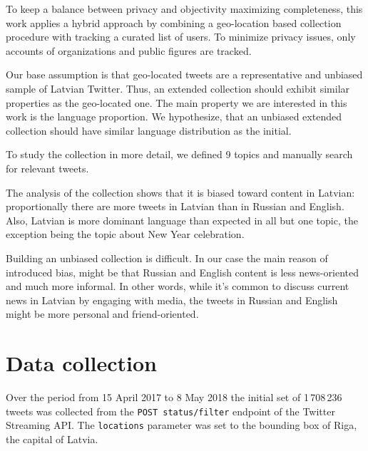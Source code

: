 \documentclass{IOS-Book-Article}
\newcommand{\hl}[1]{#1}
\begin{document}
To keep a balance between privacy and objectivity maximizing completeness, this work applies a hybrid approach by combining a geo-location based collection procedure with tracking a curated list of users. To minimize privacy issues, only accounts of organizations and public figures are tracked.


Our base assumption is that geo-located tweets are a representative and unbiased sample of Latvian Twitter. Thus, an extended collection should exhibit similar properties as the geo-located one. The main property we are interested in this work is the language proportion. We hypothesize, that an unbiased extended collection should have similar language distribution as the initial.

To study the collection in more detail, we defined 9 topics and manually search for relevant tweets.


The analysis of the collection shows that it is biased toward content in Latvian: proportionally there are more tweets in Latvian than in Russian and English. Also, Latvian is more dominant language than expected in all but one topic, the exception being the topic about New Year celebration.


Building an unbiased collection is difficult.  In our case the main reason of introduced bias, might be that Russian and English content is less news-oriented and much more informal. In other words, while it's common to discuss current news in Latvian by engaging with media, the tweets in Russian and English might be more personal and friend-oriented.

\section{Data collection}
\label{sec:data-collection}

Over the period from 15 April 2017 to \hl{8 May 2018} the initial set of \hl{1\,708\,236} tweets was collected from the \texttt{POST status/filter} endpoint of the Twitter Streaming API.%
%
%
The \texttt{locations} parameter was set to the bounding box of Riga, the capital of Latvia.%
%
\end{document}
